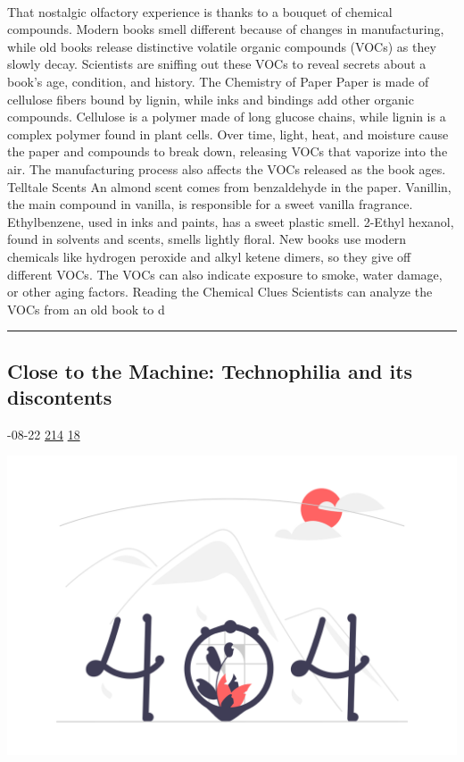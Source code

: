\documentclass[10pt,a4paper]{article}
\begin{document}
\begin{multicols*}{2}
\paragraph{}
 That nostalgic olfactory experience is thanks to a bouquet of chemical compounds.
Modern books smell different because of changes in manufacturing, while old books release distinctive volatile organic compounds (VOCs) as they slowly decay. Scientists are sniffing out these VOCs to reveal secrets about a book’s age, condition, and history.
The Chemistry of Paper
Paper is made of cellulose fibers bound by lignin, while inks and bindings add other organic compounds. Cellulose is a polymer made of long glucose chains, while lignin is a complex polymer found in plant cells.
Over time, light, heat, and moisture cause the paper and compounds to break down, releasing VOCs that vaporize into the air. The manufacturing process also affects the VOCs released as the book ages.
Telltale Scents
An almond scent comes from benzaldehyde in the paper. Vanillin, the main compound in vanilla, is responsible for a sweet vanilla fragrance. Ethylbenzene, used in inks and paints, has a sweet plastic smell. 2-Ethyl hexanol, found in solvents and scents, smells lightly floral.
New books use modern chemicals like hydrogen peroxide and alkyl ketene dimers, so they give off different VOCs. The VOCs can also indicate exposure to smoke, water damage, or other aging factors.
Reading the Chemical Clues
Scientists can analyze the VOCs from an old book to d
\par\noindent\textcolor{red}{\rule{\linewidth}{0.2mm}}
\vfill
\null
\noindent\begin{minipage}{\linewidth}
\subsection{Close to the Machine: Technophilia and its discontents}
\textsc{\footnotesize
{\scriptsize\faCalendar}-08-22 
{\scriptsize\faThumbsOUp}\space 
\href{http://news.ycombinator.com/item?id=37221487\&utm\_term=comment}{214} 
{\scriptsize\faComments}\space 
\href{http://news.ycombinator.com/item?id=37221487\&utm\_term=comment}{18} 
}
\par\medskip\noindent
\href{https://manu.zone/books/close-to-the-machine/?utm\_source=hackernewsletter\&utm\_medium=email\&utm\_term=books}{
    \includegraphics[width=0.99\linewidth]{notfound.png}
}
\end{minipage}

\end{multicols*}
\end{document}
